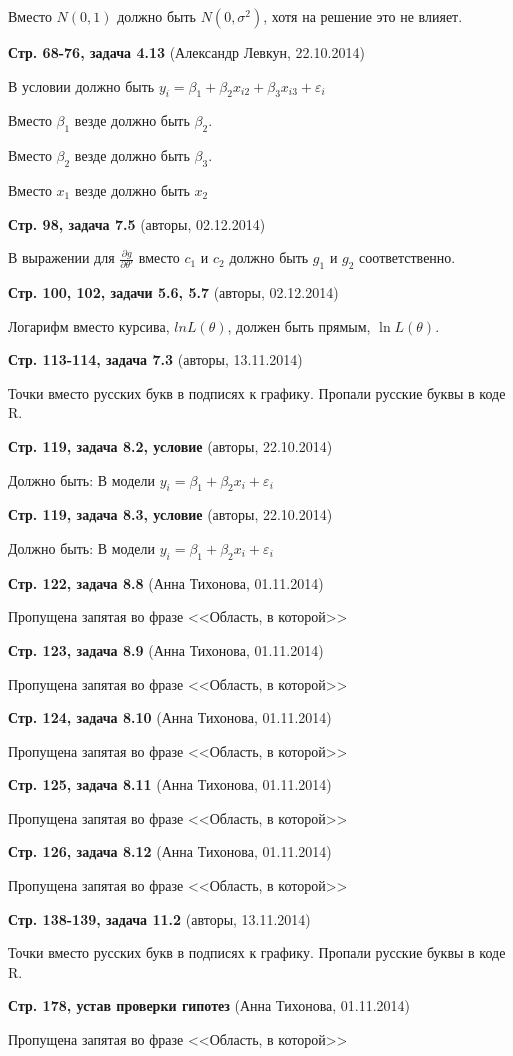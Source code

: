 \documentclass{article}
\newcommand{\erroronpage}[4]{\textbf{Стр. #1, #2} (#3, #4)}
\begin{document}
Вместо $N(0, 1)$ должно быть $N(0, \sigma^2)$, хотя на решение это не влияет.

\erroronpage{68-76}{задача 4.13}{Александр Левкун}{22.10.2014}

В условии должно быть $y_i=\beta_1+\beta_2 x_{i2} + \beta_3 x_{i3}+\varepsilon_i$

Вместо $\beta_1$ везде должно быть $\beta_2$.

Вместо $\beta_2$ везде должно быть $\beta_3$.

Вместо $x_1$ везде должно быть $x_2$

\erroronpage{98}{задача 7.5}{авторы}{02.12.2014}

В выражении для $\frac{\partial g}{\partial \theta'}$ вместо $c_1$ и $c_2$ должно быть $g_1$ и $g_2$ соответственно.

\erroronpage{100, 102}{задачи 5.6, 5.7}{авторы}{02.12.2014}

Логарифм вместо курсива, $ln L(\theta)$, должен быть прямым, $\ln L(\theta)$.


\erroronpage{113-114}{задача 7.3}{авторы}{13.11.2014}

Точки вместо русских букв в подписях к графику. Пропали русские буквы в коде R.

\erroronpage{119}{задача 8.2, условие}{авторы}{22.10.2014}

Должно быть: В модели $y_i=\beta_1 + \beta_2 x_i +\varepsilon_i$

\erroronpage{119}{задача 8.3, условие}{авторы}{22.10.2014}

Должно быть: В модели $y_i=\beta_1 + \beta_2 x_i +\varepsilon_i$

\erroronpage{122}{задача 8.8}{Анна Тихонова}{01.11.2014}

Пропущена запятая во фразе <<Область, в которой>>

\erroronpage{123}{задача 8.9}{Анна Тихонова}{01.11.2014}

Пропущена запятая во фразе <<Область, в которой>>

\erroronpage{124}{задача 8.10}{Анна Тихонова}{01.11.2014}

Пропущена запятая во фразе <<Область, в которой>>

\erroronpage{125}{задача 8.11}{Анна Тихонова}{01.11.2014}

Пропущена запятая во фразе <<Область, в которой>>

\erroronpage{126}{задача 8.12}{Анна Тихонова}{01.11.2014}

Пропущена запятая во фразе <<Область, в которой>>

\erroronpage{138-139}{задача 11.2}{авторы}{13.11.2014}

Точки вместо русских букв в подписях к графику. Пропали русские буквы в коде R.

\erroronpage{178}{устав проверки гипотез}{Анна Тихонова}{01.11.2014}

Пропущена запятая во фразе <<Область, в которой>>
\end{document}
